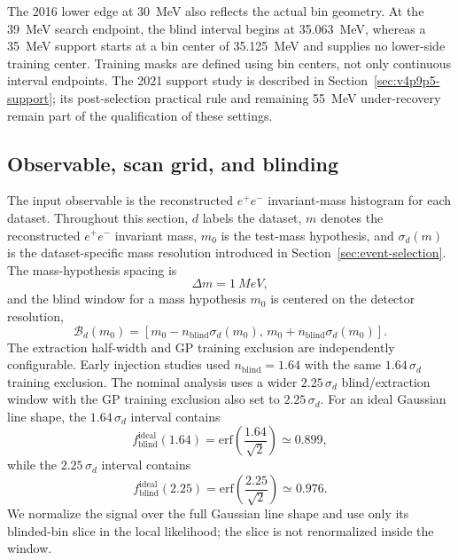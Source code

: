The 2016 lower edge at 30~MeV also reflects the actual bin geometry. At the
39~MeV search endpoint, the blind interval begins at 35.063~MeV, whereas a
35~MeV support starts at a bin center of 35.125~MeV and supplies no lower-side
training center. Training masks are defined using bin centers, not only
continuous interval endpoints. The 2021 support study is described in
Section~\ref{sec:v4p9p5-support}; its post-selection practical rule and remaining
55~MeV under-recovery remain part of the qualification of these settings.

\subsection{Observable, scan grid, and blinding}

The input observable is the reconstructed $e^+e^-$ invariant-mass histogram for each
dataset. Throughout this section, $d$ labels the dataset, $m$ denotes the reconstructed
$e^+e^-$ invariant mass, $m_0$ is the test-mass hypothesis, and $\sigma_d(m)$ is the
dataset-specific mass resolution introduced in
Section~\ref{sec:event-selection}. The mass-hypothesis spacing is
\begin{equation}
\Delta m = \SI{1}{MeV},
\end{equation}
and the blind window for a mass hypothesis $m_0$ is centered on the detector
resolution,
\begin{equation}
\mathcal{B}_d(m_0) =
\left[m_0 - n_{\mathrm{blind}}\sigma_d(m_0),\,
      m_0 + n_{\mathrm{blind}}\sigma_d(m_0)\right].
\end{equation}
The extraction half-width and GP training exclusion are independently configurable.
Early injection studies used
$n_{\mathrm{blind}}=1.64$ with the same $1.64\,\sigma_d$ training exclusion. The nominal
analysis uses a
wider $2.25\,\sigma_d$ blind/extraction window with the GP training exclusion also set
to $2.25\,\sigma_d$. For an ideal Gaussian line shape, the $1.64\,\sigma_d$ interval
contains
\begin{equation}
f_{\mathrm{blind}}^{\mathrm{ideal}}(1.64)
= \mathrm{erf}\!\left(\frac{1.64}{\sqrt{2}}\right)
\simeq 0.899,
\end{equation}
while the $2.25\,\sigma_d$ interval contains
\begin{equation}
f_{\mathrm{blind}}^{\mathrm{ideal}}(2.25)
= \mathrm{erf}\!\left(\frac{2.25}{\sqrt{2}}\right)
\simeq 0.976.
\end{equation}
We normalize the signal over the full Gaussian line shape and use only its blinded-bin
slice in the local likelihood; the slice is not renormalized inside the window.

